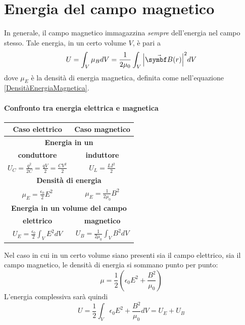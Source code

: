 \section{Energia del campo magnetico}
In generale, il campo magnetico immagazzina \textit{sempre} dell'energia nel campo stesso. Tale energia, in un certo volume $V$, è pari a
\begin{equation}
	U=\int_V\mu_BdV=\frac{1}{2\mu_0}\int_V\abs{\vba{B}(r)}^2dV
\end{equation}
dove $\mu_E$ è la densità di energia magnetica, definita come nell'equazione \eqref{DensitàEnergiaMagnetica}.
\paragraph{Confronto tra energia elettrica e magnetica}
\begin{center}
	\begin{tabular}{p{}p{}}
		\multicolumn{1}{c|}{\textbf{Caso elettrico}} &
		\multicolumn{1}{c}{\textbf{Caso magnetico}} \\ \hline
		\multicolumn{2}{c}{\textbf{Energia in un}}\\
		\multicolumn{1}{c|}{\textbf{conduttore}} &
		\multicolumn{1}{c}{\textbf{induttore}} \\ \hline
		\multicolumn{1}{c|}{$\displaystyle U_C=\frac{q^2}{2C}=\frac{qV}{2}=\frac{CV^2}{2}$} & \multicolumn{1}{c}{$\displaystyle U_L=\frac{LI^2}{2}$}\\ \hline
		\multicolumn{2}{c}{\textbf{Densità di energia}}\\ \hline
		\multicolumn{1}{c|}{$\displaystyle \mu_E=\frac{\epsilon_0}{2}E^2$} & \multicolumn{1}{c}{$\displaystyle \mu_E=\frac{1}{2\mu_0}B^2$}\\ \hline
		\multicolumn{2}{c}{\textbf{Energia in un volume del campo}}\\ 
		\multicolumn{1}{c|}{\textbf{elettrico}} &
		\multicolumn{1}{c}{\textbf{magnetico}} \\ \hline
		\multicolumn{1}{c|}{$\displaystyle U_E=\frac{\epsilon_0}{2}\int_V E^2dV$} & \multicolumn{1}{c}{$\displaystyle U_B=\frac{1}{2\mu_0}\int_V B^2dV$}\\
	\end{tabular}
\end{center}
Nel caso in cui in un certo volume siano presenti sia il campo elettrico, sia il campo magnetico, le densità di energia si sommano punto per punto:
\begin{equation}
	\mu=\frac{1}{2}\left(\epsilon_0E^2+\frac{B^2}{\mu_0}\right)
\end{equation}
L'energia complessiva sarà quindi
\begin{equation}
	U=\frac{1}{2}\int_V \epsilon_0E^2+\frac{B^2}{\mu_0}dV=U_E+U_B
\end{equation}

